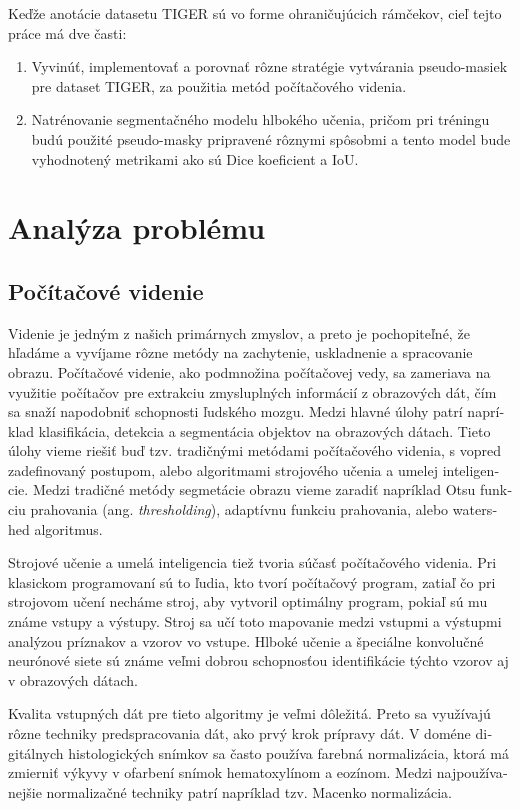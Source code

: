 \begin{otherlanguage}{slovak}
Keďže anotácie datasetu TIGER sú vo forme ohraničujúcich rámčekov, cieľ tejto práce má dve časti:

\begin{enumerate}
    \item Vyvinúť, implementovať a porovnať rôzne stratégie vytvárania pseudo-masiek pre dataset TIGER, za použitia metód počítačového videnia.
    \item Natrénovanie segmentačného modelu hlbokého učenia, pričom pri tréningu budú použité pseudo-masky pripravené rôznymi spôsobmi a tento model bude vyhodnotený metrikami ako sú Dice koeficient a IoU.
\end{enumerate} 

\section{Analýza problému}

\subsection{Počítačové videnie}
Videnie je jedným z našich primárnych zmyslov, a preto je pochopiteľné, že hľadáme a vyvíjame rôzne metódy na zachytenie, uskladnenie a spracovanie obrazu. Počítačové videnie, ako podmnožina počítačovej vedy, sa zameriava na využitie počítačov pre extrakciu zmysluplných informácií z obrazových dát, čím sa snaží napodobniť schopnosti ľudského mozgu. Medzi hlavné úlohy patrí napríklad klasifikácia, detekcia a segmentácia objektov na obrazových dátach. Tieto úlohy vieme riešiť buď tzv. tradičnými metódami počítačového videnia, s vopred zadefinovaný postupom, alebo algoritmami strojového učenia a umelej inteligencie. Medzi tradičné metódy segmetácie obrazu vieme zaradiť napríklad Otsu funkciu prahovania (ang. \textit{thresholding}), adaptívnu funkciu prahovania, alebo watershed algoritmus.

Strojové učenie a umelá inteligencia tiež tvoria súčasť počítačového videnia. Pri klasickom programovaní sú to ľudia, kto tvorí počítačový program, zatiaľ čo pri strojovom učení necháme stroj, aby vytvoril optimálny program, pokiaľ sú mu známe vstupy a výstupy. Stroj sa učí toto mapovanie medzi vstupmi a výstupmi analýzou príznakov a vzorov vo vstupe. Hlboké učenie a špeciálne konvolučné neurónové siete sú známe veľmi dobrou schopnosťou identifikácie týchto vzorov aj v obrazových dátach.

Kvalita vstupných dát pre tieto algoritmy je veľmi dôležitá. Preto sa využívajú rôzne techniky predspracovania dát, ako prvý krok prípravy dát. V doméne digitálnych histologických snímkov sa často používa farebná normalizácia, ktorá má zmierniť výkyvy v ofarbení snímok hematoxylínom a eozínom. Medzi najpoužívanejšie normalizačné techniky patrí napríklad tzv. Macenko normalizácia.


\end{otherlanguage}
